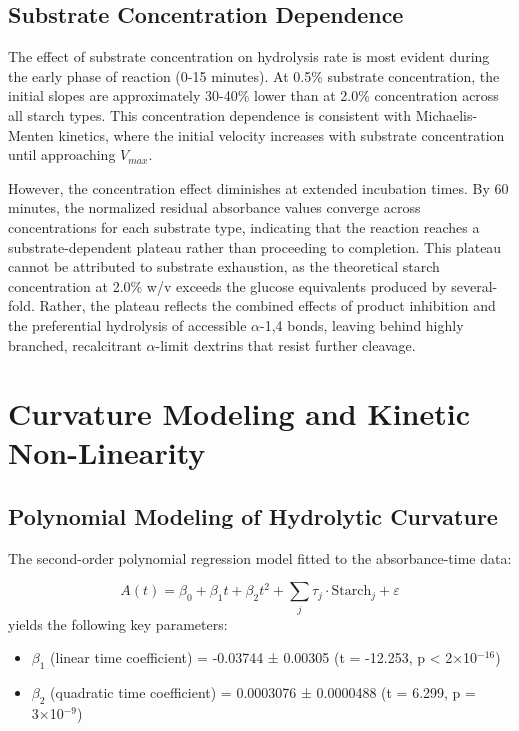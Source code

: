 \documentclass[
  12pt,
]{article}
\begin{document}
\subsection{Substrate Concentration
Dependence}\label{substrate-concentration-dependence}

The effect of substrate concentration on hydrolysis rate is most evident
during the early phase of reaction (0-15 minutes). At 0.5\% substrate
concentration, the initial slopes are approximately 30-40\% lower than
at 2.0\% concentration across all starch types. This concentration
dependence is consistent with Michaelis-Menten kinetics, where the
initial velocity increases with substrate concentration until
approaching \(V_{max}\).

However, the concentration effect diminishes at extended incubation
times. By 60 minutes, the normalized residual absorbance values converge
across concentrations for each substrate type, indicating that the
reaction reaches a substrate-dependent plateau rather than proceeding to
completion. This plateau cannot be attributed to substrate exhaustion,
as the theoretical starch concentration at 2.0\% w/v exceeds the glucose
equivalents produced by several-fold. Rather, the plateau reflects the
combined effects of product inhibition and the preferential hydrolysis
of accessible \(\alpha\)-1,4 bonds, leaving behind highly branched,
recalcitrant \(\alpha\)-limit dextrins that resist further cleavage.

\section{Curvature Modeling and Kinetic
Non-Linearity}\label{curvature-modeling-and-kinetic-non-linearity}

\subsection{Polynomial Modeling of Hydrolytic
Curvature}\label{polynomial-modeling-of-hydrolytic-curvature}

The second-order polynomial regression model fitted to the
absorbance-time data:

\[A(t) = \beta_0 + \beta_1 t + \beta_2 t^2 + \sum_{j} \tau_j \cdot \text{Starch}_j + \varepsilon\]
yields the following key parameters:

\begin{itemize}
\item
  \(\beta_1\) (linear time coefficient) = -0.03744 ± 0.00305 (t =
  -12.253, p \textless{} 2×10\(^{-16}\))
\item
  \(\beta_2\) (quadratic time coefficient) = 0.0003076 ± 0.0000488 (t =
  6.299, p = 3×10\(^{-9}\))
\end{itemize}
\end{document}
